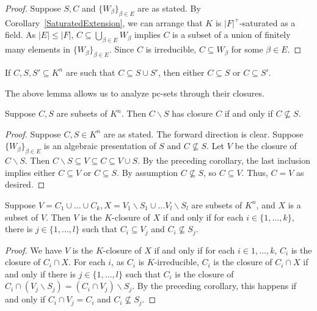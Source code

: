 \begin{proof}
Suppose $S, C$ and $\{W_\beta\}_{ \beta \in E}$ are as stated. By Corollary~\ref{SaturatedExtension}, we can arrange that $K$ is $|F|^+$-saturated as a field. As $|E| \leq |F|$, $C \subseteq \bigcup_{\beta \in E} W_\beta $ implies $C$ is a subset of a union of finitely many elements in $\{W_\beta\}_{ \beta \in E}$. Since $C$ is irreducible, $C \subseteq W_\beta$ for some $\beta \in E$.
\end{proof}


\begin{cor} \label{Smallness2}
If $C, S, S' \subseteq K^n$ are such that $C \subseteq S\cup S'$, then either $C \subseteq S$ or $C \subseteq S'$.
\end{cor}

\noindent
The above lemma allows us to analyze pc-sets through their closures.

\begin{cor} \label{Smallness3}
Suppose $C, S$ are subsets of $K^n$. Then  $C \backslash S$ has closure $C$ if and only if $C \nsubseteq S$.
\end{cor}

\begin{proof}
 Suppose $C, S \in K^n$ are as stated. The forward direction is clear. Suppose $ \{W_\beta \}_{\beta \in E}$ is an algebraic presentation of $S$ and $C \nsubseteq S$. Let $V$ be the closure of $C \backslash S$. Then $C \backslash S \subseteq V \subseteq C \subseteq V \cup S $. By the preceding corollary, the last inclusion implies either $C \subseteq V$ or $C \subseteq S$. By assumption $C \nsubseteq S$, so $C \subseteq V$. Thus, $C = V$ as desired.
\end{proof}

\begin{cor} \label{Smallness4}
Suppose $V=C_1\cup\ldots\cup C_k, X = V_1 \backslash S_1 \cup \ldots V_l \backslash S_l$ are subsets of $K^n$, and $X$ is a subset of $ V$. Then $V$ is the  $K$-closure of $X$ if and only if for each $i \in \{1, \ldots,k\}$, there is $j \in  \{1, \ldots, l\} $ such that $C_i \subseteq V_j$ and $C_i \nsubseteq S_j$.
\end{cor}

\begin{proof}
We have $V$ is the $K$-closure of $X$ if and only if for each $i \in {1, \ldots, k}$, $C_i$ is the closure of $C_i \cap X$. For each $i$, as $C_i$ is $K$-irreducible, $C_i$ is the closure of $C_i \cap X$ if and only if there is  $j \in \{1, \ldots, l\} $ such that $C_i$ is the closure of $ C_i \cap ( V_j \backslash S_j)= (C_i \cap V_j) \backslash S_j$. By the preceding corollary, this happens if and only if $C_i \cap V_j =C_i$ and $C_i \nsubseteq S_j$.
\end{proof}

